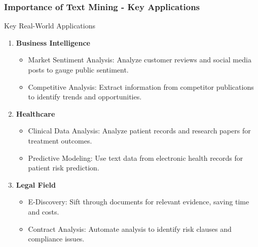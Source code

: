 \documentclass[aspectratio=169]{beamer}
\begin{document}
\begin{frame}[fragile]
    \frametitle{Importance of Text Mining - Key Applications}
    \begin{block}{Key Real-World Applications}
        \begin{enumerate}
            \item \textbf{Business Intelligence}
                \begin{itemize}
                    \item Market Sentiment Analysis: Analyze customer reviews and social media posts to gauge public sentiment.
                    \item Competitive Analysis: Extract information from competitor publications to identify trends and opportunities.
                \end{itemize}
            \item \textbf{Healthcare}
                \begin{itemize}
                    \item Clinical Data Analysis: Analyze patient records and research papers for treatment outcomes.
                    \item Predictive Modeling: Use text data from electronic health records for patient risk prediction.
                \end{itemize}
            \item \textbf{Legal Field}
                \begin{itemize}
                    \item E-Discovery: Sift through documents for relevant evidence, saving time and costs.
                    \item Contract Analysis: Automate analysis to identify risk clauses and compliance issues.
                \end{itemize}
        \end{enumerate}
    \end{block}
\end{frame}
\end{document}
